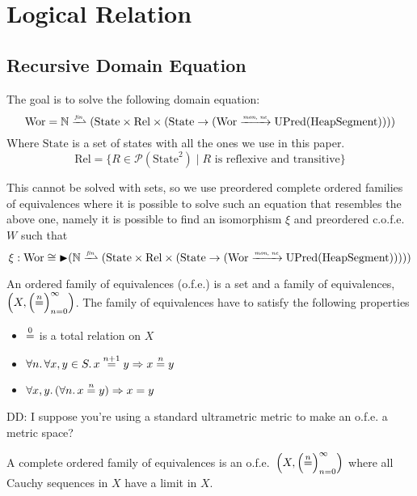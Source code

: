 \documentclass{article}
\newcommand{\finparfun}{\xrightharpoonup{\textit{\tiny{fin}}}}
\newcommand{\monnefun}{\xrightarrow{\textit{\tiny{mon, ne}}}}
\newcommand{\fun}{\rightarrow}
\newcommand{\nequal}[1][n]{\stackrel{\tiny{#1}}{=}}
\newcommand{\blater}{\mathop{\blacktriangleright}}
\newcommand{\powerset}[1]{\mathcal{P}(#1)}
\newcommand{\cofe}{c.o.f.e.}
\newcommand{\cofes}{\cofe{}'s}
\newcommand\dominique[1]{{\color{purple} \sf \footnotesize {DD: #1}}\\}
\newcommand{\plaindom}[1]{\mathrm{#1}}
\newcommand{\HeapSegments}{\plaindom{HeapSegment}}
\newcommand{\nats}{\mathbb{N}}
\newcommand{\Rel}{\plaindom{Rel}}
\newcommand{\States}{\plaindom{State}}
\newcommand{\Wor}{\plaindom{Wor}}
\newcommand{\UPred}[1]{\plaindom{UPred}(#1)}
\begin{document}
\section{Logical Relation}
\label{sec:logical-relation}
\subsection{Recursive Domain Equation}
\label{subsec:recursive-dom-eq}
The goal is to solve the following domain equation:
\[
\Wor = \nats \finparfun (\States \times \Rel \times (\States \fun (\Wor \monnefun \UPred{\HeapSegments})))
\]
Where $\States$ is a set of states with all the ones we use in this paper.
\[
\Rel= \{R \in \powerset{\States^2} \mid R \text{ is reflexive and transitive} \}
\]

This cannot be solved with sets, so we use preordered complete ordered families of equivalences where it is possible to solve such an equation that resembles the above one, namely it is possible to find an isomorphism $\xi$ and preordered \cofe{} $W$ such that
\[
  \xi : \Wor \cong \blater (\nats \finparfun (\States \times \Rel \times (\States \fun (\Wor \monnefun \UPred{\HeapSegments}))))
\]

\begin{definition}[o.f.e's]
  An ordered family of equivalences (o.f.e.) is a set and a family of equivalences, $\left(X, \left(\nequal\right)_{n=0}^{\infty} \right)$. The family of equivalences have to satisfy the following properties
  \begin{itemize}
  \item $\nequal[0]$ is a total relation on $X$
  \item $\forall n \ldotp \forall x,y \in S \ldotp x \nequal[n+1] y \Rightarrow x \nequal y$
  \item $\forall x,y \ldotp(\forall n \ldotp x \nequal y) \Rightarrow x=y$
  \end{itemize}
\end{definition}

\dominique{I suppose you're using a standard ultrametric metric to make an
  o.f.e. a metric space?}
\begin{definition}[\cofes]
  A complete ordered family of equivalences is an o.f.e.\ $\left(X, \left(\nequal\right)_{n=0}^{\infty} \right)$ where all Cauchy sequences in $X$ have a limit in $X$.
\end{definition}
\end{document}
